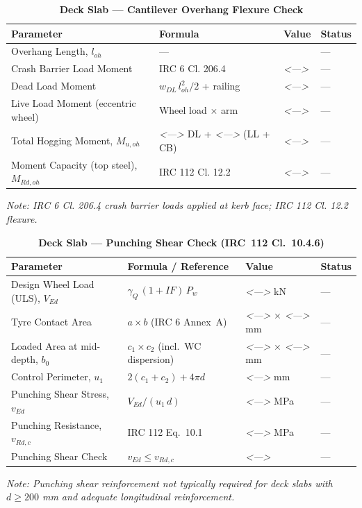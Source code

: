 \documentclass[12pt,a4paper]{report}
\numberwithin{table}{chapter}
\numberwithin{figure}{chapter}
\newcommand{\placeholder}[1]{\textit{\textless #1\textgreater}}
\begin{document}
\vspace{1em}
\begin{longtable}{|L{5.5cm}|C{3.5cm}|>{\centering\arraybackslash}p{4.5cm}|C{2cm}|}
\caption{\textbf{Deck Slab --- Cantilever Overhang Flexure Check}}
\hline
\textbf{Parameter} & \textbf{Formula} & \textbf{Value} & \textbf{Status} \\[6pt]
\hline
Overhang Length, $l_{oh}$ & --- &  & --- \\[6pt]
\hline
Crash Barrier Load Moment & IRC 6 Cl. 206.4 & \placeholder{---} & --- \\[6pt]
\hline
Dead Load Moment & $w_{DL}\,l_{oh}^2/2$ + railing & \placeholder{---} & --- \\[6pt]
\hline
Live Load Moment (eccentric wheel) & Wheel load $\times$ arm & \placeholder{---} & --- \\[6pt]
\hline
Total Hogging Moment, $M_{u,oh}$ & \placeholder{---} DL + \placeholder{---} (LL + CB) & \placeholder{---} & --- \\[6pt]
\hline
Moment Capacity (top steel), $M_{Rd,oh}$ & IRC 112 Cl. 12.2 & \placeholder{---} & --- \\[6pt]
\hline
\end{longtable}
\noindent\textit{Note: IRC 6 Cl. 206.4 crash barrier loads applied at kerb face; IRC 112 Cl. 12.2 flexure.}

\vspace{1em}
\begin{longtable}{|L{5.5cm}|C{3.5cm}|>{\centering\arraybackslash}p{4.5cm}|C{2cm}|}
\caption{\textbf{Deck Slab --- Punching Shear Check (IRC~112 Cl.~10.4.6)}}
\hline
\textbf{Parameter} & \textbf{Formula / Reference} & \textbf{Value} & \textbf{Status} \\[6pt]
\hline
Design Wheel Load (ULS), $V_{Ed}$ & $\gamma_Q\,(1+IF)\,P_w$ & \placeholder{---} kN & --- \\[6pt]
\hline
Tyre Contact Area & $a \times b$ (IRC 6 Annex~A) & \placeholder{---} $\times$ \placeholder{---} mm & --- \\[6pt]
\hline
Loaded Area at mid-depth, $b_0$ & $c_1 \times c_2$ (incl.\ WC dispersion) & \placeholder{---} $\times$ \placeholder{---} mm & --- \\[6pt]
\hline
Control Perimeter, $u_1$ & $2(c_1+c_2) + 4\pi d$ & \placeholder{---} mm & --- \\[6pt]
\hline
Punching Shear Stress, $v_{Ed}$ & $V_{Ed} / (u_1\,d)$ & \placeholder{---} MPa & --- \\[6pt]
\hline
Punching Resistance, $v_{Rd,c}$ & IRC 112 Eq.\ 10.1 & \placeholder{---} MPa & --- \\[6pt]
\hline
Punching Shear Check & $v_{Ed} \leq v_{Rd,c}$ & \placeholder{---} & --- \\[6pt]
\hline
\end{longtable}
\noindent\textit{Note: Punching shear reinforcement not typically required for deck slabs with $d \geq 200$ mm and adequate longitudinal reinforcement.}
\end{document}

